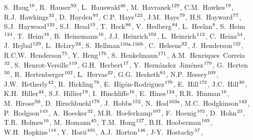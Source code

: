 \begin{flushleft}
S.~Haug$^\textrm{\scriptsize 18}$,
R.~Hauser$^\textrm{\scriptsize 93}$,
L.~Hauswald$^\textrm{\scriptsize 46}$,
M.~Havranek$^\textrm{\scriptsize 129}$,
C.M.~Hawkes$^\textrm{\scriptsize 19}$,
R.J.~Hawkings$^\textrm{\scriptsize 32}$,
D.~Hayden$^\textrm{\scriptsize 93}$,
C.P.~Hays$^\textrm{\scriptsize 122}$,
J.M.~Hays$^\textrm{\scriptsize 79}$,
H.S.~Hayward$^\textrm{\scriptsize 77}$,
S.J.~Haywood$^\textrm{\scriptsize 133}$,
S.J.~Head$^\textrm{\scriptsize 19}$,
T.~Heck$^\textrm{\scriptsize 86}$,
V.~Hedberg$^\textrm{\scriptsize 84}$,
L.~Heelan$^\textrm{\scriptsize 8}$,
S.~Heim$^\textrm{\scriptsize 124}$,
T.~Heim$^\textrm{\scriptsize 16}$,
B.~Heinemann$^\textrm{\scriptsize 16}$,
J.J.~Heinrich$^\textrm{\scriptsize 102}$,
L.~Heinrich$^\textrm{\scriptsize 112}$,
C.~Heinz$^\textrm{\scriptsize 54}$,
J.~Hejbal$^\textrm{\scriptsize 129}$,
L.~Helary$^\textrm{\scriptsize 24}$,
S.~Hellman$^\textrm{\scriptsize 150a,150b}$,
C.~Helsens$^\textrm{\scriptsize 32}$,
J.~Henderson$^\textrm{\scriptsize 122}$,
R.C.W.~Henderson$^\textrm{\scriptsize 75}$,
Y.~Heng$^\textrm{\scriptsize 176}$,
S.~Henkelmann$^\textrm{\scriptsize 171}$,
A.M.~Henriques~Correia$^\textrm{\scriptsize 32}$,
S.~Henrot-Versille$^\textrm{\scriptsize 119}$,
G.H.~Herbert$^\textrm{\scriptsize 17}$,
Y.~Hern\'andez~Jim\'enez$^\textrm{\scriptsize 170}$,
G.~Herten$^\textrm{\scriptsize 50}$,
R.~Hertenberger$^\textrm{\scriptsize 102}$,
L.~Hervas$^\textrm{\scriptsize 32}$,
G.G.~Hesketh$^\textrm{\scriptsize 81}$,
N.P.~Hessey$^\textrm{\scriptsize 109}$,
J.W.~Hetherly$^\textrm{\scriptsize 42}$,
R.~Hickling$^\textrm{\scriptsize 79}$,
E.~Hig\'on-Rodriguez$^\textrm{\scriptsize 170}$,
E.~Hill$^\textrm{\scriptsize 172}$,
J.C.~Hill$^\textrm{\scriptsize 30}$,
K.H.~Hiller$^\textrm{\scriptsize 44}$,
S.J.~Hillier$^\textrm{\scriptsize 19}$,
I.~Hinchliffe$^\textrm{\scriptsize 16}$,
E.~Hines$^\textrm{\scriptsize 124}$,
R.R.~Hinman$^\textrm{\scriptsize 16}$,
M.~Hirose$^\textrm{\scriptsize 50}$,
D.~Hirschbuehl$^\textrm{\scriptsize 178}$,
J.~Hobbs$^\textrm{\scriptsize 152}$,
N.~Hod$^\textrm{\scriptsize 163a}$,
M.C.~Hodgkinson$^\textrm{\scriptsize 143}$,
P.~Hodgson$^\textrm{\scriptsize 143}$,
A.~Hoecker$^\textrm{\scriptsize 32}$,
M.R.~Hoeferkamp$^\textrm{\scriptsize 107}$,
F.~Hoenig$^\textrm{\scriptsize 102}$,
D.~Hohn$^\textrm{\scriptsize 23}$,
T.R.~Holmes$^\textrm{\scriptsize 16}$,
M.~Homann$^\textrm{\scriptsize 45}$,
T.M.~Hong$^\textrm{\scriptsize 127}$,
B.H.~Hooberman$^\textrm{\scriptsize 169}$,
W.H.~Hopkins$^\textrm{\scriptsize 118}$,
Y.~Horii$^\textrm{\scriptsize 105}$,
A.J.~Horton$^\textrm{\scriptsize 146}$,
J-Y.~Hostachy$^\textrm{\scriptsize 57}$,

\end{flushleft}
